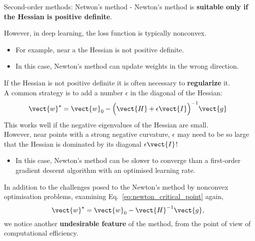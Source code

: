 \begin{frame}[t,allowframebreaks]{
    Second-order methods: Netwon's method -}
    \gls{Newton's method} is {\bf suitable only
    if the \gls{Hessian} is 
    \gls{positive definite}}.\\
    \vspace{0.2cm}

    However, in deep learning,  
    the \gls{loss function} is typically
    nonconvex.\\
    \begin{itemize}
        \small
        \item For example, near a 
        the \gls{Hessian} is not \gls{positive definite}.
        \item In this case, \gls{Newton's method} can
        update weights in the wrong direction.
    \end{itemize}
    \vspace{0.2cm}
    If the \gls{Hessian} is not \gls{positive definite}
    it is often necessary to {\bf regularize} it.\\
    \vspace{0.1cm}
    A common strategy is to add a number 
    $\epsilon$ in the diagonal of the \gls{Hessian}:
    \begin{equation}
        \vect{w}^{\star} = \vect{w}_{0} - 
          \Big(\vect{H} + \epsilon \vect{I}\Big)^{-1} \vect{g}
        \label{eq:newton_critical_point_w_regularization}  
    \end{equation}
    This works well if the negative eigenvalues 
    of the \gls{Hessian} are small.\\
    \vspace{0.1cm}
    However, near points with a strong negative curvature, 
    $\epsilon$ may need to be so large that the \gls{Hessian}
    is dominated by its diagonal $\epsilon \vect{I}$!
    \begin{itemize}
        \small
        \item In this case, \gls{Newton's method} can be slower to
        converge than a first-order \gls{gradient descent}
        algorithm with an optimised \gls{learning rate}.\\
    \end{itemize}

    \framebreak
 

    In addition to the challenges posed to the 
    \gls{Newton's method} 
    by nonconvex \gls{optimisation} problems,
    examining Eq.~\ref{eq:newton_critical_point} again,
    \begin{equation*}
        \vect{w}^{\star} = \vect{w}_{0} - \vect{H}^{-1} \vect{g},
    \end{equation*}
    we notice another {\bf undesirable feature} of the method,
    from the point of view of computational efficiency.\\
    \vspace{0.2cm}


\end{frame}
